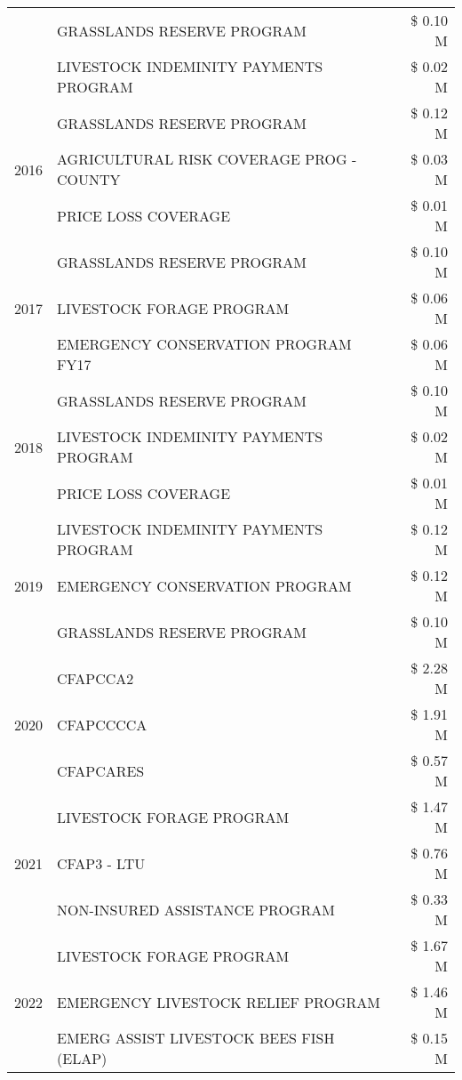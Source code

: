 \begin{tabular}{llr}
 & GRASSLANDS RESERVE PROGRAM & \$ 0.10 M \\
 & LIVESTOCK INDEMINITY PAYMENTS PROGRAM & \$ 0.02 M \\
\cline{1-3}
\multirow[t]{3}{*}{2016} & GRASSLANDS RESERVE PROGRAM & \$ 0.12 M \\
 & AGRICULTURAL RISK COVERAGE PROG - COUNTY & \$ 0.03 M \\
 & PRICE LOSS COVERAGE & \$ 0.01 M \\
\cline{1-3}
\multirow[t]{3}{*}{2017} & GRASSLANDS RESERVE PROGRAM & \$ 0.10 M \\
 & LIVESTOCK FORAGE PROGRAM & \$ 0.06 M \\
 & EMERGENCY CONSERVATION PROGRAM FY17 & \$ 0.06 M \\
\cline{1-3}
\multirow[t]{3}{*}{2018} & GRASSLANDS RESERVE PROGRAM & \$ 0.10 M \\
 & LIVESTOCK INDEMINITY PAYMENTS PROGRAM & \$ 0.02 M \\
 & PRICE LOSS COVERAGE & \$ 0.01 M \\
\cline{1-3}
\multirow[t]{3}{*}{2019} & LIVESTOCK INDEMINITY PAYMENTS PROGRAM & \$ 0.12 M \\
 & EMERGENCY CONSERVATION PROGRAM & \$ 0.12 M \\
 & GRASSLANDS RESERVE PROGRAM & \$ 0.10 M \\
\cline{1-3}
\multirow[t]{3}{*}{2020} & CFAPCCA2 & \$ 2.28 M \\
 & CFAPCCCCA & \$ 1.91 M \\
 & CFAPCARES & \$ 0.57 M \\
\cline{1-3}
\multirow[t]{3}{*}{2021} & LIVESTOCK FORAGE PROGRAM & \$ 1.47 M \\
 & CFAP3 - LTU & \$ 0.76 M \\
 & NON-INSURED ASSISTANCE PROGRAM & \$ 0.33 M \\
\cline{1-3}
\multirow[t]{3}{*}{2022} & LIVESTOCK FORAGE PROGRAM & \$ 1.67 M \\
 & EMERGENCY LIVESTOCK RELIEF PROGRAM & \$ 1.46 M \\
 & EMERG ASSIST LIVESTOCK BEES FISH (ELAP) & \$ 0.15 M \\
\cline{1-3}
\bottomrule
\end{tabular}
